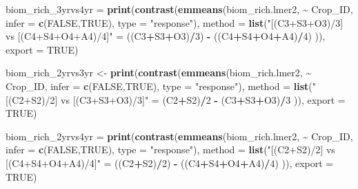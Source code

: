 \documentclass[
]{article}
\newenvironment{Shaded}{\begin{snugshade}}{\end{snugshade}}
\newcommand{\AttributeTok}[1]{\textcolor[rgb]{0.13,0.29,0.53}{#1}}
\newcommand{\ConstantTok}[1]{\textcolor[rgb]{0.56,0.35,0.01}{#1}}
\newcommand{\DecValTok}[1]{\textcolor[rgb]{0.00,0.00,0.81}{#1}}
\newcommand{\FunctionTok}[1]{\textcolor[rgb]{0.13,0.29,0.53}{\textbf{#1}}}
\newcommand{\NormalTok}[1]{#1}
\newcommand{\OtherTok}[1]{\textcolor[rgb]{0.56,0.35,0.01}{#1}}
\newcommand{\SpecialCharTok}[1]{\textcolor[rgb]{0.81,0.36,0.00}{\textbf{#1}}}
\newcommand{\StringTok}[1]{\textcolor[rgb]{0.31,0.60,0.02}{#1}}
\begin{document}
\begin{Shaded}
\begin{Highlighting}[]
\NormalTok{biom\_rich\_3yrvs4yr }\OtherTok{=} \FunctionTok{print}\NormalTok{(}\FunctionTok{contrast}\NormalTok{(}\FunctionTok{emmeans}\NormalTok{(biom\_rich.lmer2, }\SpecialCharTok{\textasciitilde{}}\NormalTok{ Crop\_ID,}
                                            \AttributeTok{infer =} \FunctionTok{c}\NormalTok{(}\ConstantTok{FALSE}\NormalTok{,}\ConstantTok{TRUE}\NormalTok{),}
                                            \AttributeTok{type =} \StringTok{"response"}\NormalTok{),}
                                    \AttributeTok{method =} \FunctionTok{list}\NormalTok{(}\StringTok{"[(C3+S3+O3)/3] vs [(C4+S4+O4+A4)/4]"} \OtherTok{=} 
\NormalTok{                                                    ((C3}\SpecialCharTok{+}\NormalTok{S3}\SpecialCharTok{+}\NormalTok{O3)}\SpecialCharTok{/}\DecValTok{3}\NormalTok{) }\SpecialCharTok{{-}}\NormalTok{ ((C4}\SpecialCharTok{+}\NormalTok{S4}\SpecialCharTok{+}\NormalTok{O4}\SpecialCharTok{+}\NormalTok{A4)}\SpecialCharTok{/}\DecValTok{4}\NormalTok{) )),}
                           \AttributeTok{export =} \ConstantTok{TRUE}\NormalTok{)}

\NormalTok{biom\_rich\_2yrvs3yr }\OtherTok{\textless{}{-}} \FunctionTok{print}\NormalTok{(}\FunctionTok{contrast}\NormalTok{(}\FunctionTok{emmeans}\NormalTok{(biom\_rich.lmer2, }\SpecialCharTok{\textasciitilde{}}\NormalTok{ Crop\_ID,}
                                             \AttributeTok{infer =} \FunctionTok{c}\NormalTok{(}\ConstantTok{FALSE}\NormalTok{,}\ConstantTok{TRUE}\NormalTok{), }
                                             \AttributeTok{type =} \StringTok{"response"}\NormalTok{),}
                                     \AttributeTok{method =} \FunctionTok{list}\NormalTok{(}\StringTok{"[(C2+S2)/2] vs [(C3+S3+O3)/3]"} \OtherTok{=}
\NormalTok{                                                     (C2}\SpecialCharTok{+}\NormalTok{S2)}\SpecialCharTok{/}\DecValTok{2} \SpecialCharTok{{-}}\NormalTok{ (C3}\SpecialCharTok{+}\NormalTok{S3}\SpecialCharTok{+}\NormalTok{O3)}\SpecialCharTok{/}\DecValTok{3}\NormalTok{ )),}
                            \AttributeTok{export =} \ConstantTok{TRUE}\NormalTok{)}


\NormalTok{biom\_rich\_2yrvs4yr }\OtherTok{=} \FunctionTok{print}\NormalTok{(}\FunctionTok{contrast}\NormalTok{(}\FunctionTok{emmeans}\NormalTok{(biom\_rich.lmer2, }\SpecialCharTok{\textasciitilde{}}\NormalTok{ Crop\_ID,}
                                            \AttributeTok{infer =} \FunctionTok{c}\NormalTok{(}\ConstantTok{FALSE}\NormalTok{,}\ConstantTok{TRUE}\NormalTok{),}
                                            \AttributeTok{type =} \StringTok{"response"}\NormalTok{), }
                                    \AttributeTok{method =} \FunctionTok{list}\NormalTok{(}\StringTok{"[(C2+S2)/2] vs [(C4+S4+O4+A4)/4]"} \OtherTok{=}
\NormalTok{                                                    ((C2}\SpecialCharTok{+}\NormalTok{S2)}\SpecialCharTok{/}\DecValTok{2}\NormalTok{) }\SpecialCharTok{{-}}\NormalTok{ ((C4}\SpecialCharTok{+}\NormalTok{S4}\SpecialCharTok{+}\NormalTok{O4}\SpecialCharTok{+}\NormalTok{A4)}\SpecialCharTok{/}\DecValTok{4}\NormalTok{) )), }
                           \AttributeTok{export =} \ConstantTok{TRUE}\NormalTok{)}


\end{Highlighting}
\end{Shaded}
\end{document}
